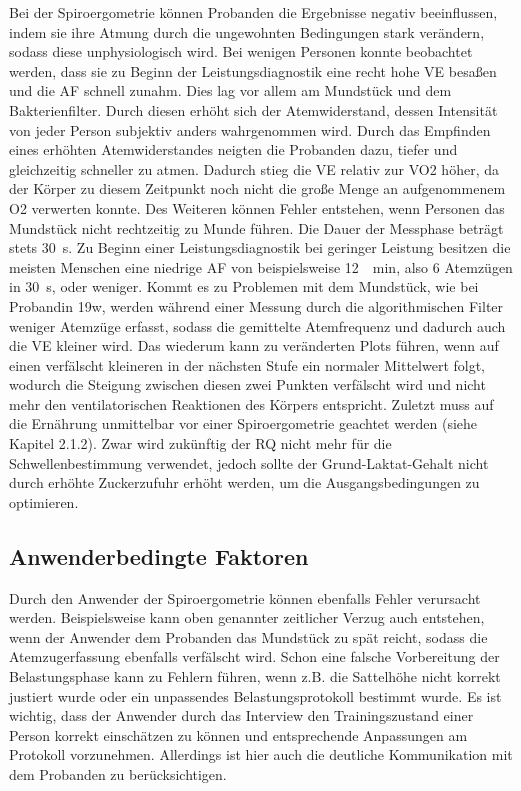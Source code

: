 Bei der Spiroergometrie können Probanden die Ergebnisse negativ beeinflussen, indem sie ihre Atmung durch die ungewohnten Bedingungen stark verändern, sodass diese unphysiologisch wird. Bei wenigen Personen konnte beobachtet werden, dass sie zu Beginn der Leistungsdiagnostik eine recht hohe \acs{VE} besaßen und die \acs{AF} schnell zunahm. Dies lag vor allem am Mundstück und dem Bakterienfilter. Durch diesen erhöht sich der Atemwiderstand, dessen Intensität von jeder Person subjektiv anders wahrgenommen wird. Durch das Empfinden eines erhöhten Atemwiderstandes neigten die Probanden dazu, tiefer und gleichzeitig schneller zu atmen. Dadurch stieg die \acs{VE} relativ zur \acs{VO2} höher, da der Körper zu diesem Zeitpunkt noch nicht die große Menge an aufgenommenem \acs{O2} verwerten konnte. Des Weiteren können Fehler entstehen, wenn Personen das Mundstück nicht rechtzeitig zu Munde führen. Die Dauer der Messphase beträgt stets \SI{30}{\second}. Zu Beginn einer Leistungsdiagnostik bei geringer Leistung besitzen die meisten Menschen eine niedrige \acs{AF} von beispielsweise \SI{12}{\per\minute}, also $6$ Atemzügen in \SI{30}{\second}, oder weniger. Kommt es zu Problemen mit dem Mundstück, wie bei Probandin 19w, werden während einer Messung durch die algorithmischen Filter weniger Atemzüge erfasst, sodass die gemittelte Atemfrequenz und dadurch auch die \acs{VE} kleiner wird. Das wiederum kann zu veränderten Plots führen, wenn auf einen verfälscht kleineren in der nächsten Stufe ein normaler Mittelwert folgt, wodurch die Steigung zwischen diesen zwei Punkten verfälscht wird und nicht mehr den ventilatorischen Reaktionen des Körpers entspricht. Zuletzt muss auf die Ernährung unmittelbar vor einer Spiroergometrie geachtet werden (siehe Kapitel 2.1.2). Zwar wird zukünftig der RQ nicht mehr für die Schwellenbestimmung verwendet, jedoch sollte der Grund-Laktat-Gehalt nicht durch erhöhte Zuckerzufuhr erhöht werden, um die Ausgangsbedingungen zu optimieren.

\subsection{Anwenderbedingte Faktoren}

Durch den Anwender der Spiroergometrie können ebenfalls Fehler verursacht werden. Beispielsweise kann oben genannter zeitlicher Verzug auch entstehen, wenn der Anwender dem Probanden das Mundstück zu spät reicht, sodass die Atemzugerfassung ebenfalls verfälscht wird. Schon eine falsche Vorbereitung der Belastungsphase kann zu Fehlern führen, wenn z.B. die Sattelhöhe nicht korrekt justiert wurde oder ein unpassendes Belastungsprotokoll bestimmt wurde. Es ist wichtig, dass der Anwender durch das Interview den Trainingszustand einer Person korrekt einschätzen zu können und entsprechende Anpassungen am Protokoll vorzunehmen. Allerdings ist hier auch die deutliche Kommunikation mit dem Probanden zu berücksichtigen.

